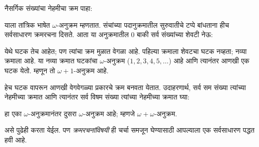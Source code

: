 \documentclass[../../../include/open-logic-section]{subfiles}
\begin{document}

नैसर्गिक संख्यांचा नेहमीचा क्रम पाहा:
\begin{center}
\end{center}
याला तांत्रिक भाषेत $\omega$-अनुक्रम म्हणतात. संचांच्या पदानुक्रमातील सुरुवातीचे टप्पे बांधताना हीच सर्वसाधारण क्रमरचना दिसते. आता या अनुक्रमातील $0$ बाकी सर्व संख्यांच्या शेवटी नेऊ:
\begin{center}
\end{center}
येथे घटक तेच आहेत; पण त्यांचा क्रम मुळात वेगळा आहे. पहिल्या क्रमाला शेवटचा घटक नव्हता; नव्या क्रमाला आहे. या नव्या क्रमात घटकांचा $\omega$-अनुक्रम ($1, 2, 3, 4, 5, \ldots$) आहे आणि त्यानंतर आणखी एक घटक येतो. म्हणून तो $\omega+1$-अनुक्रम आहे.

हेच घटक वापरून आणखी वेगवेगळ्या प्रकारचे क्रम बनवता येतात. उदाहरणार्थ, सर्व सम संख्या त्यांच्या नेहमीच्या क्रमात आणि त्यानंतर सर्व विषम संख्या त्यांच्या नेहमीच्या क्रमात घ्या:
\begin{center}
\end{center}
हा एका $\omega$-अनुक्रमानंतर दुसरा $\omega$-अनुक्रम आहे; म्हणजे $\omega+\omega$-अनुक्रम.

असे पुढेही करता येईल. पण \emph{क्रमरचनांविषयी} ही चर्चा समजून घेण्यासाठी आपल्याला एक सर्वसाधारण पद्धत हवी आहे.
\end{document}
